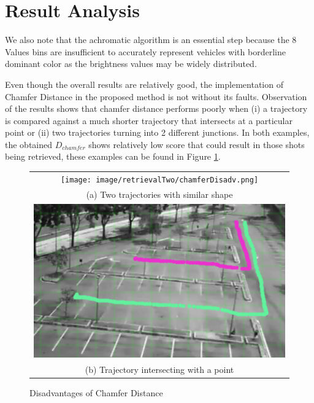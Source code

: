 \section{Result Analysis}
We also note that the achromatic algorithm is an essential step because the 8 Values bins are insufficient to accurately represent vehicles with borderline dominant color as the brightness values may be widely distributed.

Even though the overall results are relatively good, the implementation of Chamfer Distance in the proposed method is not without its faults. Observation of the results shows that chamfer distance performs poorly when (i) a trajectory is compared against a much shorter trajectory that intersects at a particular point or (ii) two trajectories turning into 2 different junctions. In both examples, the obtained $D_{chamfer}$ shows relatively low score that could result in those shots being retrieved, these examples can be found in Figure  \ref{fig:chamferDisadvantage}.

\begin{figure}[htb!]
  \centering
\begin{tabular}{c}
 \texttt{[image: image/retrievalTwo/chamferDisadv.png]}\\
 (a) Two trajectories with similar shape \\
 \includegraphics[width=0.9\linewidth]{image/retrievalTwo/chamferDisadv2.png} \\
 (b) Trajectory intersecting with a point
\end{tabular}
\caption{Disadvantages of Chamfer Distance} \label{fig:chamferDisadvantage}
\end{figure}


 \\


